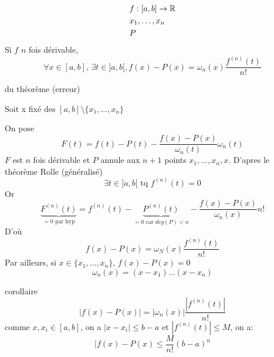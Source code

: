 \begin{theorem}
    \begin{align*}
        &f: [a, b] \to \mathbb{R} \\
        &x_1, \ldots, x_n \\
        &P
    \end{align*}
    Si $f$  $n$ fois dérivable,  
    \[
        \forall x \in [a, b], \, \exists t \in ]a, b[, f(x) - P(x) = \omega_n(x)\frac{f^{(n)}(t)}{n!}
    \] 
\end{theorem}
\begin{preuve} du théorème (erreur)
    \par
    Soit x fixé des $[a, b] \setminus \{x_1, \ldots, x_n\}$
    \par
    On pose 
    \[
    F(t) = f(t) - P(t) - \frac{f(x) - P(x)}{\omega_n(t)}\omega_n(t)
    \] 
    $F$ est  $n$ fois dérivable et  $P$ annule aux  $n+1$ points  $x_1, \ldots, x_n, x$. D'apres le théorème Rolle (généralisé) 
    \[
        \exists t \in ]a, b[ \text{ tq } f^{(n)}(t) = 0
    \] 
    Or
    \[
        \underbrace{F^{(n)}(t)}_{= 0 \text{ par hyp}} = f^{(n)}(t) - \underbrace{P^{(n)}(t)}_{= 0 \text{ car } deg(P) < n} - \frac{f(x) - P(x)}{\omega_n(x)}n!
    \] 
    D'où
    \[
        f(x) - P(x) = \omega_N(x) \frac{f^{(n)}(t)}{n!}
    \] 
    Par ailleurs, si $x \in \{x_1, \ldots, x_n\}, \, f(x) - P(x) = 0$
    \[
    \omega_n(x) = (x - x_1)\ldots(x - x_n)
    \] 
\end{preuve}
\begin{preuve} corollaire
   \[
       |f(x) - P(x)| = |\omega_n(x)| \frac{|f^{(n)}(t)|}{n!}
   \]  
   comme $x, x_i \in [a, b]$, on a  $|x - x_i| \le b - a$ et $|f^{(n)}(t)| \le M$, on a:
   \[
   |f(x) - P(x) \le \frac{M}{n!}(b - a)^n
   \] 
\end{preuve}

